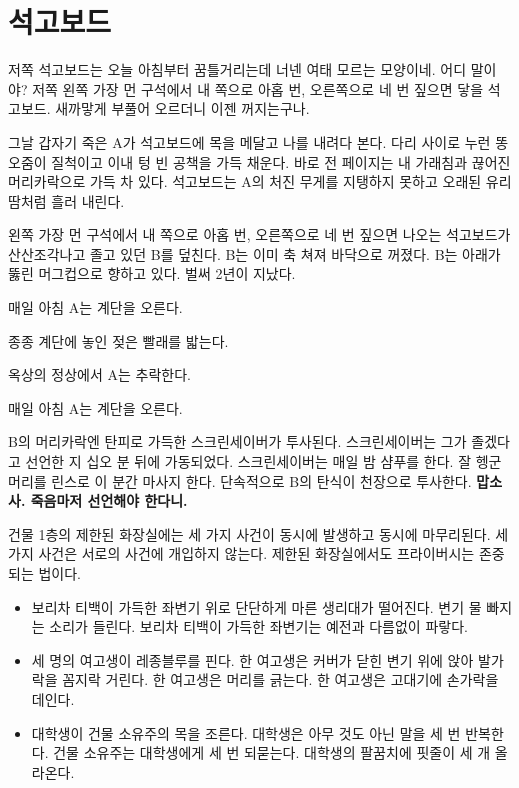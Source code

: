\documentclass[a5paper,10pt, twoside, openright]{memoir}
\begin{document}
			\mainmatter %
					\clearpage{}
				\setcounter{secnumdepth}{-2} 
				\pagestyle{plain}

			\chapter{석고보드}
	저쪽 석고보드는 오늘 아침부터 꿈틀거리는데 너넨 여태 모르는 모양이네. 어디 말이야? 저쪽 왼쪽 가장 먼 구석에서 내 쪽으로 아홉 번, 오른쪽으로 네 번 짚으면 닿을 석고보드. 새까맣게 부풀어 오르더니 이젠 꺼지는구나. 

	그날 갑자기 죽은 A가 석고보드에 목을 메달고 나를 내려다 본다. 다리 사이로 누런 똥오줌이 질척이고 이내 텅 빈 공책을 가득 채운다. 바로 전 페이지는 내 가래침과 끊어진 머리카락으로 가득 차 있다. 석고보드는 A의 처진 무게를 지탱하지 못하고 오래된 유리 땀처럼 흘러 내린다. 

	왼쪽 가장 먼 구석에서 내 쪽으로 아홉 번, 오른쪽으로 네 번 짚으면 나오는 석고보드가 산산조각나고 졸고 있던 B를 덮친다. B는 이미 축 쳐져 바닥으로 꺼졌다. B는 아래가 뚫린 머그컵으로 향하고 있다. 벌써 2년이 지났다. 

	매일 아침 A는 계단을 오른다.
	
	종종 계단에 놓인 젖은 빨래를 밟는다.

	옥상의 정상에서 A는 추락한다.

	매일 아침 A는 계단을 오른다. 

	B의 머리카락엔 탄피로 가득한 스크린세이버가 투사된다. 스크린세이버는 그가 졸겠다고 선언한 지 십오 분 뒤에 가동되었다. 스크린세이버는 매일 밤 샴푸를 한다. 잘 헹군 머리를 린스로 이 분간 마사지 한다. 단속적으로 B의 탄식이 천장으로 투사한다. \textbf{맙소사. 죽음마저 선언해야 한다니.}

	건물 1층의 제한된 화장실에는 세 가지 사건이 동시에 발생하고 동시에 마무리된다. 세 가지 사건은 서로의 사건에 개입하지 않는다. 제한된 화장실에서도 프라이버시는 존중되는 법이다. 
	
				\begin{adjustwidth}{1em}{3em}
					\begin{itemize}[\textperiodcentered]
						\item 보리차 티백이 가득한 좌변기 위로 단단하게 마른 생리대가 떨어진다. 변기 물 빠지는 소리가 들린다. 보리차 티백이 가득한 좌변기는 예전과 다름없이 파랗다. 
						\item 세 명의 여고생이 레종블루를 핀다. 한 여고생은 커버가 닫힌 변기 위에 앉아 발가락을 꼼지락 거린다. 한 여고생은 머리를 긁는다. 한 여고생은 고대기에 손가락을 데인다. 
						\item 대학생이 건물 소유주의 목을 조른다. 대학생은 아무 것도 아닌 말을 세 번 반복한다. 건물 소유주는 대학생에게 세 번 되묻는다. 대학생의 팔꿈치에 핏줄이 세 개 올라온다. 
					\end{itemize}
				\end{adjustwidth}
	
\end{document}
